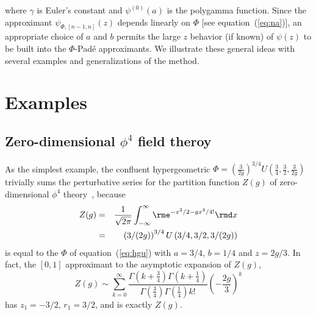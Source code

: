 \documentclass[12pt]{iopart}
\begin{document}
where $\gamma$ is Euler's constant and $\psi^{(0)}(a)$ is the polygamma function.
Since the approximant $\psi_{\Phi,[n-1,n]}(z)$ depends linearly on $\Phi$ [see equation~(\ref{eq:na})],
an appropriate choice of $a$ and $b$ permits the large $z$ behavior (if known) of $\psi(z)$ to be built into the $\Phi$-Pad\'e
approximants. We illustrate these general ideas with several examples and generalizations of the method.
\section{Examples}
\subsection{Zero-dimensional $\phi^4$ field theroy}
As the simplest example, the confluent hypergeometric $\Phi=(\frac{3}{2g})^{3/4}U\left( \frac{3}{4},\frac{3}{2},\frac{3}{2g}  \right)$ trivially sums the perturbative series
for the partition function $Z(g)$ of zero-dimensional $\phi^4$ theory~\cite{ZJ02,ZJ10},
because
%
\begin{eqnarray}
	Z(g) & = & \frac{1}{\sqrt{2\pi}}\int_{-\infty}^{\infty} \rme^{-x^2/2-gx^4/4!} \rmd x \\
	       & = & \left(  {3}/({2g}) \right)^{3/4}U \left({3}/{4}, {3}/{2}, {3}/({2g})  \right)
\end{eqnarray}
is equal to the $\Phi$ of equation~(\ref{eq:hgu}) with $a=3/4$, $b=1/4$ and $z=2g/3$.
In fact, the $[0,1]$ approximant to the asymptotic expansion of $Z(g)$,
%
\begin{equation}
	Z(g)  \sim 
	              \sum _{k=0}^\infty
	               \frac{ \Gamma \left(k+\frac{3}{4}\right) \Gamma \left(k+\frac{1}{4}\right)}{\Gamma \left(\frac{3}{4}\right) \Gamma \left(\frac{1}{4}\right) k!}
	               \left(-\frac{2 g}{3}\right)^k
\end{equation}
%
has $z_1=-3/2$, $r_1=3/2$, and is exactly $Z(g)$.
\end{document}
